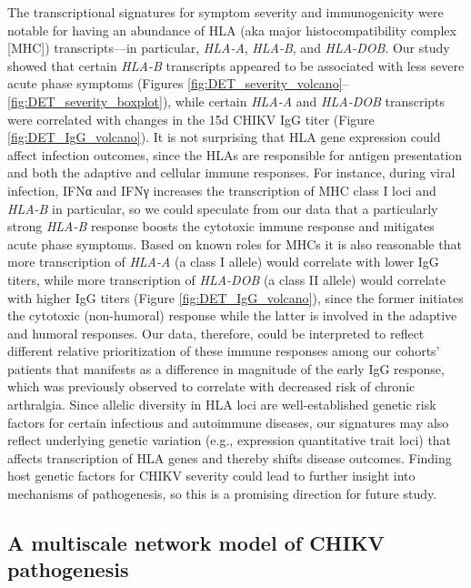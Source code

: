 The transcriptional signatures for symptom severity and immunogenicity were notable for having an abundance of HLA (aka major histocompatibility complex [MHC]) transcripts—in particular, \emph{HLA-A}, \emph{HLA-B}, and \emph{HLA-DOB}. Our study showed that certain \emph{HLA-B} transcripts appeared to be associated with less severe acute phase symptoms (Figures \ref{fig:DET_severity_volcano}–\ref{fig:DET_severity_boxplot}), while certain \emph{HLA-A} and \emph{HLA-DOB} transcripts were correlated with changes in the 15d CHIKV IgG titer (Figure \ref{fig:DET_IgG_volcano}). It is not surprising that HLA gene expression could affect infection outcomes, since the HLAs are responsible for antigen presentation and both the adaptive and cellular immune responses. For instance, during viral infection, IFNα and IFNγ increases the transcription of MHC class I loci and \emph{HLA-B} in particular,\autocite{Girdlestone1995} so we could speculate from our data that a particularly strong \emph{HLA-B} response boosts the cytotoxic immune response and mitigates acute phase symptoms. Based on known roles for MHCs it is also reasonable that more transcription of \emph{HLA-A} (a class I allele) would correlate with lower IgG titers, while more transcription of \emph{HLA-DOB} (a class II allele) would correlate with higher IgG titers (Figure \ref{fig:DET_IgG_volcano}), since the former initiates the cytotoxic (non-humoral) response while the latter is involved in the adaptive and humoral responses. Our data, therefore, could be interpreted to reflect different relative prioritization of these immune responses among our cohorts’ patients that manifests as a difference in magnitude of the early IgG response, which was previously observed to correlate with decreased risk of chronic arthralgia.\autocite{Kam2012} Since allelic diversity in HLA loci are well-established genetic risk factors for certain infectious and autoimmune diseases, our signatures may also reflect underlying genetic variation (e.g., expression quantitative trait loci) that affects transcription of HLA genes and thereby shifts disease outcomes.\autocite{Kumar2014} Finding host genetic factors for CHIKV severity could lead to further insight into mechanisms of pathogenesis, so this is a promising direction for future study.

\subsection{A multiscale network model of CHIKV pathogenesis}

